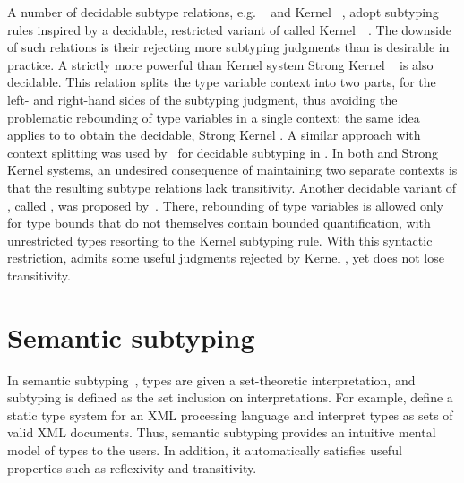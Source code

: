 A number of decidable subtype relations,
e.g. \WyvSelf~\cite{mackay:path-dep-dec:2020}
and Kernel \DSub~\cite{hu:dot-undec:2020},
adopt subtyping rules inspired by a decidable, restricted variant of \FSub
called Kernel~\FSub~\cite{cardelli:types-poly:1985}.
The downside of such relations is their rejecting more subtyping judgments
than is desirable in practice.
A strictly more powerful than Kernel \DSub system
Strong Kernel \DSub~\cite{hu:dot-undec:2020} is also decidable.
This relation splits the type variable context into two parts, for the left-
and right-hand sides of the subtyping judgment, thus avoiding the problematic
rebounding of type variables in a single context;
the same idea applies to \FSub to obtain the decidable, Strong Kernel \FSub.
A similar approach with context splitting was used
by~\citet{mackay:path-dep-dec:2020} for decidable subtyping in \WyvFix.
In both \WyvFix and Strong Kernel systems,
an undesired consequence of maintaining two separate contexts
is that the resulting subtype relations lack transitivity.
Another decidable variant of \FSub, called \FSubR, was proposed
by~\citet{mackay:bound-poly-sub-dec:2020}. There, %
rebounding of type variables is allowed
only for type bounds that do not themselves contain bounded quantification,
with unrestricted types resorting to the Kernel subtyping rule.
With this syntactic restriction, \FSubR admits some useful judgments
rejected by Kernel \FSub, yet does not lose transitivity.

\section{Semantic subtyping}

In semantic subtyping~\cite{frih:sem-sub:2008}, types are given a set-theoretic
interpretation, and subtyping is defined as the set inclusion on
interpretations.
For example, \citet{hosoya:reg-types-XML:2000} define a static type system for
an XML processing language and interpret types as sets of valid XML documents.
Thus, semantic subtyping provides an intuitive mental
model of types to the users. In addition, it automatically satisfies
useful properties such as reflexivity and transitivity.

